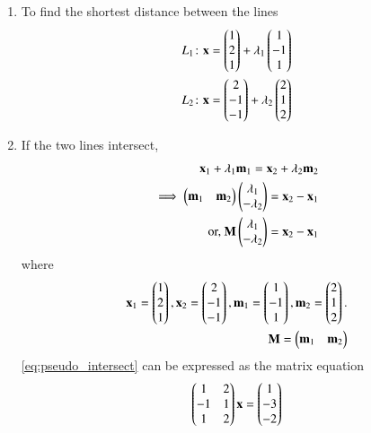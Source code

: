 \renewcommand{\theequation}{\theenumi}
\begin{enumerate}[label=\thesubsection.\arabic*.,ref=\thesubsection.\theenumi]

\item To find the shortest distance between the lines 
\begin{align}
    L_1\colon \mathbf{x}=\begin{pmatrix}1\\2\\1\end{pmatrix}+\lambda_1\begin{pmatrix}1\\-1\\1\end{pmatrix}\label{eq:pseudo:1}\\
    L_2\colon \mathbf{x}=\begin{pmatrix}2\\-1\\-1\end{pmatrix}+\lambda_2\begin{pmatrix}2\\1\\2\end{pmatrix}\label{eq:pseudo:2}
\end{align}
\item If the two lines intersect,
\begin{align}
\mathbf{x}_1 + \lambda_1 \mathbf{m}_1
=\mathbf{x}_2 + \lambda_2 \mathbf{m}_2
\\
\implies \begin{pmatrix}\mathbf{m}_1 & \mathbf{m}_2\end{pmatrix}\begin{pmatrix}\lambda_1 \\ -\lambda_2\end{pmatrix} = \mathbf{x}_2 - \mathbf{x}_1
\\
\text{or, } \mathbf{M}\begin{pmatrix}\lambda_1 \\ -\lambda_2\end{pmatrix} = \mathbf{x}_2 - \mathbf{x}_1
\label{eq:pseudo_intersect}
\end{align}
%
where 
\begin{align}
\label{eq:pseudo_xm}
\mathbf{x}_1 = \begin{pmatrix}1\\2\\1\end{pmatrix},
\mathbf{x}_2 = \begin{pmatrix}2\\-1\\-1\end{pmatrix},
\mathbf{m}_1 = \begin{pmatrix}1\\-1\\1\end{pmatrix},
\mathbf{m}_2 = \begin{pmatrix}2\\1\\2\end{pmatrix}.
\\
\mathbf{M} =\begin{pmatrix}\mathbf{m}_1 & \mathbf{m}_2\end{pmatrix}
\label{eq:pseudo_rect}
\end{align}
\eqref{eq:pseudo_intersect} can be expressed as the matrix equation 
\begin{align}
\begin{pmatrix}
1 & 2
\\
-1 & 1
\\
1 & 2
\end{pmatrix}
\mathbf{x} =
\begin{pmatrix}1 \\ -3 \\ -2\end{pmatrix}
\label{eq:pseudo_mat_eq}
\end{align}


\end{enumerate}
